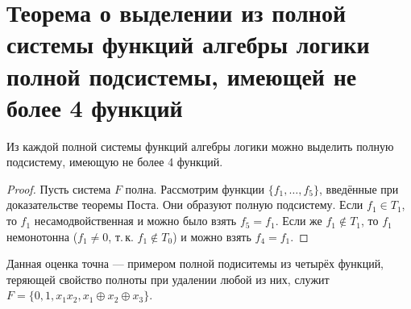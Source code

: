 \section{Теорема о выделении из полной системы функций алгебры логики полной подсистемы, имеющей не более 4 функций}

\begin{theorem}
    Из каждой полной системы функций алгебры логики можно выделить полную подсистему, имеющую не более 4 функций.
\end{theorem}

\begin{proof}
    Пусть система $F$ полна. Рассмотрим функции $\{f_1, \ldots, f_5\}$, введённые при доказательстве теоремы Поста. Они образуют полную подсистему. Если $f_1 \in T_1$, то $f_1$ несамодвойственная и можно было взять $f_5 = f_1$. Если же $f_1 \notin T_1$, то $f_1$ немонотонна ($f_1 \ne 0$, т.\,к. $f_1 \notin T_0$) и можно взять $f_4 = f_1$.
\end{proof}

\begin{remark}
    Данная оценка точна --- примером полной подиситемы из четырёх функций, теряющей свойство полноты при удалении любой из них, служит $F = \{0, 1, x_1x_2, x_1 \oplus x_2 \oplus x_3\}$.
\end{remark}

